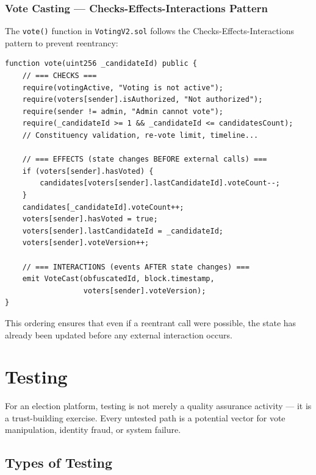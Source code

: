 \documentclass[oneside,a4paper,12pt]{book}
\begin{document}
\subsection{Vote Casting --- Checks-Effects-Interactions Pattern}
The \texttt{vote()} function in \texttt{VotingV2.sol} follows the Checks-Effects-Interactions pattern to prevent reentrancy:

\begin{lstlisting}[language=Solidity, caption={Vote Function --- Checks-Effects-Interactions Pattern}]
function vote(uint256 _candidateId) public {
    // === CHECKS ===
    require(votingActive, "Voting is not active");
    require(voters[sender].isAuthorized, "Not authorized");
    require(sender != admin, "Admin cannot vote");
    require(_candidateId >= 1 && _candidateId <= candidatesCount);
    // Constituency validation, re-vote limit, timeline...

    // === EFFECTS (state changes BEFORE external calls) ===
    if (voters[sender].hasVoted) {
        candidates[voters[sender].lastCandidateId].voteCount--;
    }
    candidates[_candidateId].voteCount++;
    voters[sender].hasVoted = true;
    voters[sender].lastCandidateId = _candidateId;
    voters[sender].voteVersion++;

    // === INTERACTIONS (events AFTER state changes) ===
    emit VoteCast(obfuscatedId, block.timestamp,
                  voters[sender].voteVersion);
}
\end{lstlisting}

This ordering ensures that even if a reentrant call were possible, the state has already been updated before any external interaction occurs.

\chapter{Testing}

For an election platform, testing is not merely a quality assurance activity --- it is a trust-building exercise. Every untested path is a potential vector for vote manipulation, identity fraud, or system failure.

\section{Types of Testing}
\end{document}
